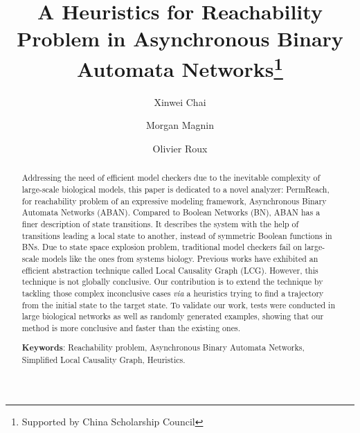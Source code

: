 \documentclass[runningheads]{llncs}
\begin{document}
\title{A Heuristics for Reachability Problem in Asynchronous Binary Automata Networks\thanks{Supported by
China Scholarship Council}}
\author{Xinwei Chai \and Morgan Magnin \and Olivier Roux}
\maketitle             
\begin{abstract}
Addressing the need of efficient model checkers due to the inevitable complexity of large-scale biological models, this paper is dedicated to a novel analyzer: PermReach, for reachability problem of an expressive modeling framework, Asynchronous Binary Automata Networks (ABAN). 
Compared to Boolean Networks (BN), ABAN has a finer description of state transitions. It describes the system with the help of transitions leading a local state to another, instead of symmetric Boolean functions in BNs. 
Due to state space explosion problem, traditional model checkers fail on large-scale models like the ones from systems biology.
Previous works have exhibited an efficient abstraction technique called Local Causality Graph (LCG).
However, this technique is not globally conclusive.
Our contribution is to extend the technique by tackling those complex inconclusive cases \textit{via} a heuristics trying to find a trajectory from the initial state to the target state. 
To validate our work, tests were conducted in large biological networks as well as randomly generated examples, showing that our method is more conclusive and faster than the existing ones.

\textbf{Keywords}:
Reachability problem, Asynchronous Binary Automata Networks, Simplified Local Causality Graph, Heuristics.
\end{abstract}
\end{document}
